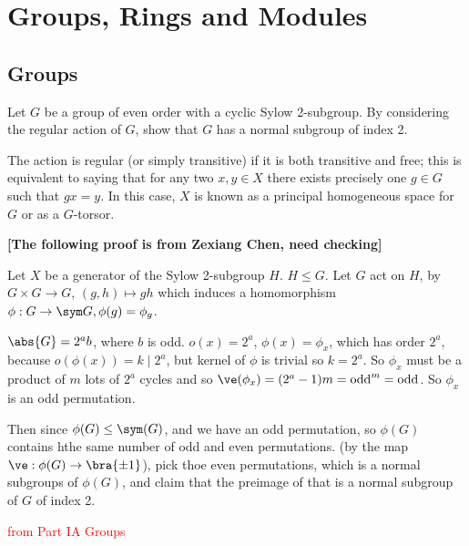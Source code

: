 
\chapter{Groups, Rings and Modules}

\section{Groups}

\begin{problem}
Let $G$ be a group of even order with a cyclic Sylow 2-subgroup. By considering the regular action of $G$, show that $G$ has a normal subgroup of index 2. %
\end{problem}

\begin{solution}[\bf Solution.]
The action is regular (or simply transitive) if it is both transitive and free; this is equivalent to saying that for any two $x, y \in X$ there exists precisely one $g \in G$ such that $gx = y$. In this case, $X$ is known as a principal homogeneous space for $G$ or as a $G$-torsor.

{\bf [The following proof is from Zexiang Chen, need checking]}

Let $X$ be a generator of the Sylow 2-subgroup $H$. $H\leq G$. Let $G$ act on $H$, by $G\times G\to G$, $(g,h) \mapsto gh$ which induces a homomorphism $\phi:G \to \sym G, \phi(g) = \phi_g$.

$\abs{G} = 2^a b$, where $b$ is odd. $o(x) = 2^a$, $\phi(x) = \phi_x$, which has order $2^a$, because $o(\phi(x)) = k\mid 2^a$, but kernel of $\phi$ is trivial so $k = 2^a$. So $\phi_x$ must be a product of $m$ lots of $2^a$ cycles and so $\ve(\phi_x) = (2^a-1)m = \text{odd}^m = \text{odd}$. So $\phi_x$ is an odd permutation.

Then since $\phi(G) \leq \sym(G)$, and we have an odd permutation, so $\phi(G)$ contains hthe same number of odd and even permutations. (by the map $\ve:\phi(G)\to \bra{\pm 1}$), pick thoe even permutations, which is a normal subgroups of $\phi(G)$, and claim that the preimage of that is a normal subgroup of $G$ of index 2.

\end{solution}

{\large \textcolor{red}{from Part IA Groups}}




